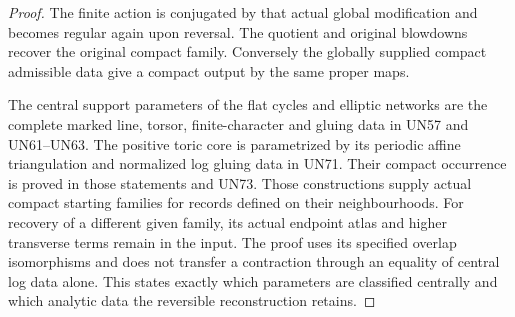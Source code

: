 \begin{proof}
The finite action is conjugated by that
actual global modification and becomes
regular again upon reversal. The quotient
and original blowdowns recover the
original compact family. Conversely the
globally supplied compact admissible
data give a compact output by the same
proper maps.

The central support parameters of the
flat cycles and elliptic networks are
the complete marked line, torsor,
finite-character and gluing data in
UN57 and UN61--UN63. The positive
toric core is parametrized by its
periodic affine triangulation and
normalized log gluing data in UN71.
Their compact occurrence is proved
in those statements and UN73.
Those constructions supply actual
compact starting families for records
defined on their neighbourhoods.
For recovery of a different given
family, its actual endpoint atlas
and higher transverse terms remain
in the input. The proof uses its
specified overlap isomorphisms and
does not transfer a contraction
through an equality of central log
data alone. This states exactly
which parameters are classified
centrally and which analytic data
the reversible reconstruction retains.
\end{proof}

